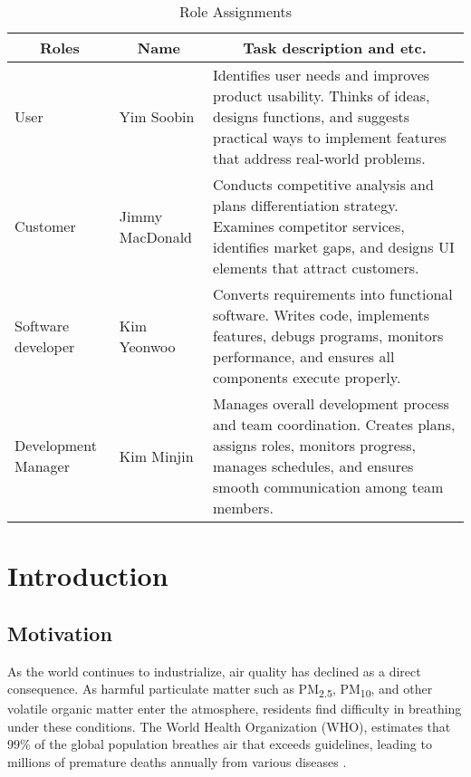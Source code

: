\documentclass[conference]{IEEEtran}
\begin{document}
\begin{table}[htbp]
\caption{Role Assignments}
\begin{center}
\small
\setlength{\tabcolsep}{6pt} 
\renewcommand{\arraystretch}{1.3} 
\begin{tabular}{|p{2cm}|p{1.5cm}|p{4cm}|}
\hline
\multicolumn{1}{|c|}{\textbf{Roles}} & \multicolumn{1}{c|}{\textbf{Name}} & \multicolumn{1}{c|}{\textbf{Task description and etc.}} \\ \hline
\centering User & \centering Yim Soobin & Identifies user needs and improves product usability. Thinks of ideas, designs functions, and suggests practical ways to implement features that address real-world problems. \\ \hline
\centering Customer & \centering Jimmy MacDonald & Conducts competitive analysis and plans differentiation strategy. Examines competitor services, identifies market gaps, and designs UI elements that attract customers. \\ \hline
\centering Software developer & \centering Kim Yeonwoo & Converts requirements into functional software. Writes code, implements features, debugs programs, monitors performance, and ensures all components execute properly. \\ \hline
\centering Development Manager & \centering Kim Minjin & Manages overall development process and team coordination. Creates plans, assigns roles, monitors progress, manages schedules, and ensures smooth communication among team members. \\ \hline
\end{tabular}%
\label{tab1}
\end{center}
\end{table}

\newpage

\section{Introduction}
\subsection{Motivation}
As the world continues to industrialize, air quality has declined as a direct consequence. As harmful particulate matter such as PM\textsubscript{2.5}, PM\textsubscript{10}, and other volatile organic matter enter the atmosphere, residents find difficulty in breathing under these conditions. The World Health Organization (WHO), estimates that 99\% of the global population breathes air that exceeds guidelines, leading to millions of premature deaths annually from various diseases \cite{b1}. 
\end{document}
